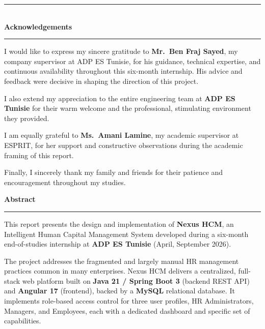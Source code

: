 \documentclass[12pt,a4paper]{report}
\begin{document}
\newpage\thispagestyle{empty}
\vspace*{2cm}
\begin{center}
  {\color{adpred}\rule{4cm}{1.2pt}}\\[1cm]
  {\LARGE\bfseries\color{adpdark} Acknowledgements}\\[1cm]
  {\color{adpred}\rule{4cm}{1.2pt}}
\end{center}
\vspace{1.2cm}

I would like to express my sincere gratitude to \textbf{Mr.\ Ben Fraj Sayed}, my company
supervisor at ADP ES Tunisie, for his guidance, technical expertise, and continuous
availability throughout this six-month internship. His advice and feedback were decisive
in shaping the direction of this project.

I also extend my appreciation to the entire engineering team at \textbf{ADP ES Tunisie}
for their warm welcome and the professional, stimulating environment they provided.

I am equally grateful to \textbf{Ms.\ Amani Lamine}, my academic supervisor at ESPRIT,
for her support and constructive observations during the academic framing of this report.

Finally, I sincerely thank my family and friends for their patience and encouragement
throughout my studies.

\vfill

\newpage\thispagestyle{empty}
\begin{center}
{\LARGE\bfseries\color{adpdark} Abstract}\\[0.5cm]
{\color{adpred}\rule{6cm}{1pt}}
\end{center}
\vspace{0.8cm}

This report presents the design and implementation of \textbf{Nexus HCM}, an Intelligent
Human Capital Management System developed during a six-month end-of-studies internship at
\textbf{ADP ES Tunisie} (April, September 2026).

The project addresses the fragmented and largely manual HR management practices common in
many enterprises. Nexus HCM delivers a centralized, full-stack web platform built on
\textbf{Java 21 / Spring Boot 3} (backend REST API) and \textbf{Angular 17} (frontend),
backed by a \textbf{MySQL} relational database. It implements role-based access control for
three user profiles, HR Administrators, Managers, and Employees, each with a dedicated
dashboard and specific set of capabilities.
\end{document}
